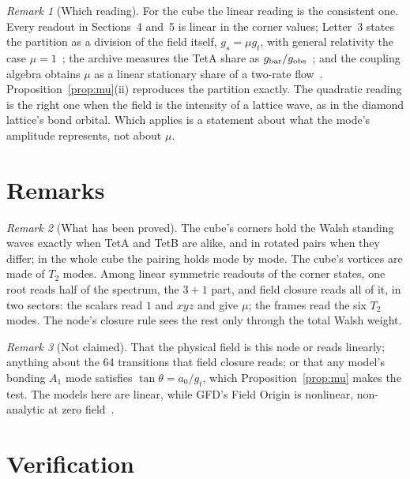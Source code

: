 \documentclass[twocolumn]{iopjournal}
\theoremstyle{definition}
\theoremstyle{remark}
\newtheorem*{remark}{Remark}
\begin{document}
\begin{remark}[Which reading]
For the cube the linear reading is the consistent one. Every readout in
Sections~4 and~5 is linear in the corner values; Letter~3 states the
partition as a division of the field itself, $g_s = \mu g_t$, with general
relativity the case $\mu = 1$~\cite{NelsonL3}; the archive measures the
TetA share as $g_{\rm bar}/g_{\rm obs}$~\cite{NelsonHourglass}; and the
coupling algebra obtains $\mu$ as a linear stationary share of a two-rate
flow~\cite{NelsonCoupling}. Proposition~\ref{prop:mu}(ii) reproduces the
partition exactly. The quadratic reading is the right one when the field
is the intensity of a lattice wave, as in the diamond lattice's bond
orbital. Which applies is a statement about what the mode's amplitude
represents, not about $\mu$.
\end{remark}


\section{Remarks}

\begin{remark}[What has been proved]
The cube's corners hold the Walsh standing waves exactly when TetA and
TetB are alike, and in rotated pairs when they differ; in the whole cube
the pairing holds mode by mode. The cube's vortices are made of $T_2$
modes. Among
linear symmetric readouts of the corner states, one root reads half of the
spectrum, the $3+1$ part, and field closure reads all of it, in two
sectors: the scalars read $1$ and $xyz$ and give $\mu$; the frames read the
six $T_2$ modes. The node's closure rule sees the rest only through the
total Walsh weight.
\end{remark}

\begin{remark}[Not claimed]
That the physical field is this node or reads linearly; anything about the
64 transitions that field closure reads; or that any model's bonding $A_1$
mode satisfies $\tan\theta = a_0/g_t$, which Proposition~\ref{prop:mu}
makes the test. The models here are linear, while GFD's Field Origin is
nonlinear, non-analytic at zero field~\cite{NelsonColes}.
\end{remark}


\section*{Verification}
\end{document}
